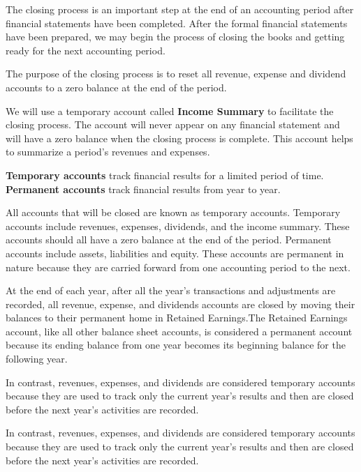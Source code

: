 \documentclass[../main.tex]{subfiles}
\begin{document}
	The closing process is an important step at the end of an accounting period 
	after financial statements have been completed. After the formal financial 
	statements have been prepared, we may begin the process of closing the 
	books and getting ready for the next accounting period. 
	
	The purpose of the 
	closing process is to reset all revenue, expense and dividend accounts to a 
	zero balance at the end of the period.
	
	We will use a temporary account called \textbf{Income Summary} to 
	facilitate the 
	closing process. The account will never appear on any financial statement 
	and will have a zero balance when the closing process is complete. This 
	account helps to summarize a period's revenues and expenses.
	
	
	\textbf{Temporary accounts} track financial results for a limited period of 
	time. 
	\textbf{Permanent accounts} track financial results from year to year. 
	
	All 
	accounts that will be closed are known as temporary accounts. Temporary 
	accounts include revenues, expenses, dividends, and the income summary. 
	These accounts should all have a zero balance at the end of the period. 
	Permanent accounts include assets, liabilities and equity. These accounts 
	are permanent in nature because they are carried forward from one 
	accounting period to the next.
	
	At the end of each year, after all the year’s transactions and adjustments 
	are recorded, all revenue, expense, and dividends accounts are closed by 
	moving their balances to their permanent home in Retained Earnings.The 
	Retained Earnings account, like all other balance sheet accounts, is 
	considered a permanent account because its ending balance from one year 
	becomes its beginning balance for the following year.
	
	In contrast, revenues, expenses, and dividends are considered temporary 
	accounts because they are used to track only the current year’s results and 
	then are closed before the next year’s activities are recorded. 
	
	In contrast, revenues, expenses, and dividends are considered temporary 
	accounts because they are used to track only the current year’s results and 
	then are closed before the next year’s activities are recorded. 
	
\end{document}
